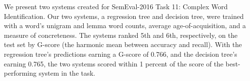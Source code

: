 We present two systems created for SemEval-2016 Task 11: Complex Word Identification. Our two systems, a regression tree and decision tree, were trained with a word's unigram and lemma word counts, average age-of-acquisition, and a measure of concreteness. The systems ranked 5th and 6th, respectively, on the test set by G-score (the harmonic mean between accuracy and recall). With the regression tree's predictions earning a G-score of 0.766, and the decision tree's earning 0.765, the two systems scored within 1 percent of the score of the best-performing system in the task.
